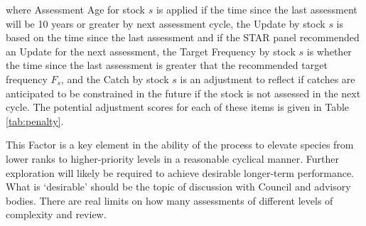 \documentclass[11pt,
  english,
  a4paper,
]{article}
\begin{document}
\leavevmode\tagmcend\tagstructend\par


where Assessment Age for stock {\(s\)\leavevmode\tagmcend\tagstructend} is applied if the time since the last assessment will be 10 years or greater by next assessment cycle, the Update by stock {\(s\)\leavevmode\tagmcend\tagstructend} is based on the time since the last assessment and if the STAR panel recommended an Update for the next assessment, the Target Frequency by stock {\(s\)\leavevmode\tagmcend\tagstructend} is whether the time since the last assessment is greater that the recommended target frequency {\(F_s\)\leavevmode\tagmcend\tagstructend}, and the Catch by stock {\(s\)\leavevmode\tagmcend\tagstructend} is an adjustment to reflect if catches are anticipated to be constrained in the future if the stock is not assessed in the next cycle. The potential adjustment scores for each of these items is given in Table \ref{tab:penalty}.

\leavevmode\tagmcend\tagstructend\par


This Factor is a key element in the ability of the process to elevate species from lower ranks to higher-priority levels in a reasonable cyclical manner. Further exploration will likely be required to achieve desirable longer-term performance. What is `desirable' should be the topic of discussion with Council and advisory bodies. There are real limits on how many assessments of different levels of complexity and review.

\leavevmode\tagmcend\tagstructend\par

\begingroup\fontsize{10}{12}\selectfont
\begingroup\fontsize{10}{12}\selectfont
\end{document}
